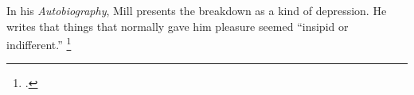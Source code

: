 \documentclass[12pt,letterpaper]{article}
\begin{document}
In his \textit{Autobiography}, Mill presents the breakdown as a kind of depression.
He writes that things that normally gave him pleasure seemed ``insipid or indifferent.''%
\footcite[77]{mill-2018}

\newpage
\pagestyle{references}

\printbibliography[title={References}]
\end{document}
